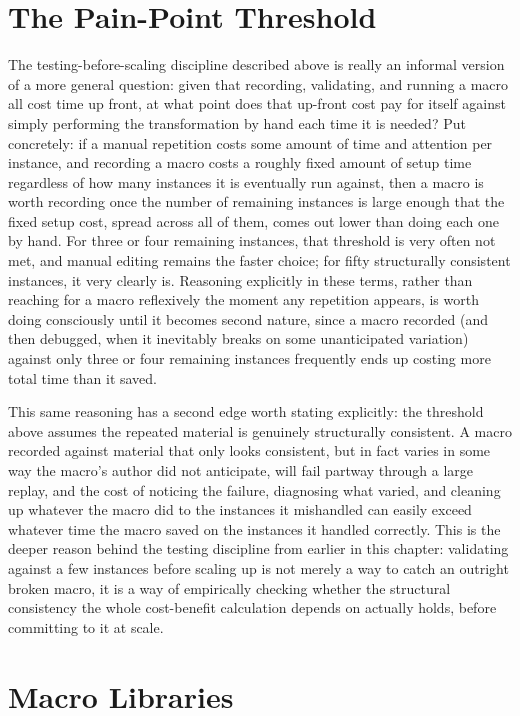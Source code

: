 \section{The Pain-Point Threshold}

The testing-before-scaling discipline described above is really an informal version of a more general question: given that recording, validating, and running a macro all cost time up front, at what point does that up-front cost pay for itself against simply performing the transformation by hand each time it is needed? Put concretely: if a manual repetition costs some amount of time and attention per instance, and recording a macro costs a roughly fixed amount of setup time regardless of how many instances it is eventually run against, then a macro is worth recording once the number of remaining instances is large enough that the fixed setup cost, spread across all of them, comes out lower than doing each one by hand. For three or four remaining instances, that threshold is very often not met, and manual editing remains the faster choice; for fifty structurally consistent instances, it very clearly is. Reasoning explicitly in these terms, rather than reaching for a macro reflexively the moment any repetition appears, is worth doing consciously until it becomes second nature, since a macro recorded (and then debugged, when it inevitably breaks on some unanticipated variation) against only three or four remaining instances frequently ends up costing more total time than it saved.

This same reasoning has a second edge worth stating explicitly: the threshold above assumes the repeated material is genuinely structurally consistent. A macro recorded against material that only looks consistent, but in fact varies in some way the macro's author did not anticipate, will fail partway through a large replay, and the cost of noticing the failure, diagnosing what varied, and cleaning up whatever the macro did to the instances it mishandled can easily exceed whatever time the macro saved on the instances it handled correctly. This is the deeper reason behind the testing discipline from earlier in this chapter: validating against a few instances before scaling up is not merely a way to catch an outright broken macro, it is a way of empirically checking whether the structural consistency the whole cost-benefit calculation depends on actually holds, before committing to it at scale.

\section{Macro Libraries}

